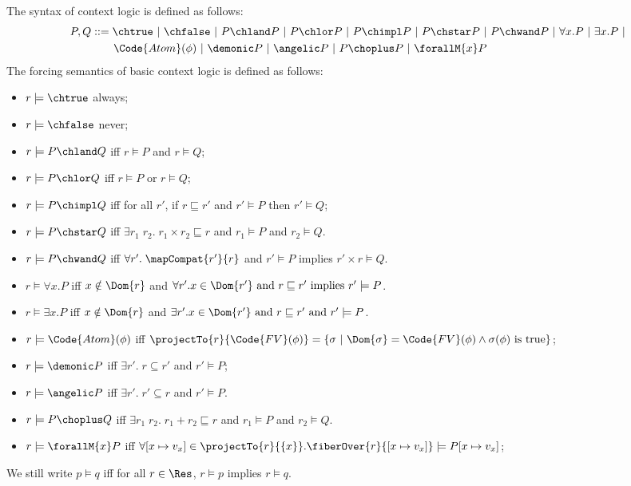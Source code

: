 \begin{definition}
\begin{definition}\label{def:context-logic} The syntax of context logic is defined as follows:
  \begin{align*}
    P, Q &::= \chtrue ~|~ \chfalse ~|~ P \chland P ~|~ P \chlor P ~|~ P \chimpl P ~|~ P \chstar P ~|~ P \chwand P ~|~ \forall x. P ~|~ \exists x. P ~|~ 
    \\& \qquad \Code{Atom}(\phi) ~|~ \demonic P ~|~ \angelic P ~|~ P \choplus P ~|~ \forallM{x} P
  \end{align*}\noindent
The forcing semantics of basic context logic is defined as follows:
\begin{itemize}
\item $r \models \chtrue$ always;
\item $r \models \chfalse$ never;
\item $r \models P \chland Q$ iff $r \models P$ and $r \models Q$;
\item $r \models P \chlor Q$ iff $r \models P$ or $r \models Q$;
\item $r \models P \chimpl Q$ iff for all $r'$, if $r \sqsubseteq r'$ and $r' \models P$ then $r' \models Q$;
\item $r \models P \chstar Q$ iff $\exists r_1\;r_2.\; r_1 \times r_2 \sqsubseteq r$ and
  $r_1 \models P$ and $r_2 \models Q$.
\item $r \models P \chwand Q$ iff $\forall r'.\; \mapCompat{r'}{r}$ and $r' \models P$ implies
  $r' \times r \models Q$.
\item $r \models \forall x.P$ iff $x\notin \Dom{r}$ and $\forall r'. x\in \Dom{r'} \text{ and }r \sqsubseteq r' \text{ implies } r' \models P$.
\item $r \models \exists x.P$ iff $x\notin \Dom{r}$ and $\exists r'. x\in \Dom{r'} \text{ and }r \sqsubseteq r' \text{ and } r' \models P$.
\item $r \models \Code{Atom}(\phi)$ iff $\projectTo{r}{\Code{FV}(\phi)} = \{\sigma ~|~ \Dom{\sigma} = \Code{FV}(\phi) \land \sigma(\phi) \text{ is true} \}$;
\item $r \models \demonic P$ iff $\exists r'.\; r \subseteq r'$ and
$r' \models P$;
\item $r \models \angelic P$ iff $\exists r'.\; r' \subseteq r$ and
$r' \models P$.
\item $r \models P \choplus Q$ iff $\exists r_1\;r_2.\; r_1 + r_2 \sqsubseteq r$ and
  $r_1 \models P$ and $r_2 \models Q$.
\item $r \models \forallM{x}P$ iff $\forall [x\mapsto v_x] \in \projectTo{r}{\{x\}}. \fiberOver{r}{[x\mapsto v_x]} \models P[x\mapsto v_x]$;
\end{itemize}
We still write $p \models q$ iff for all $r \in \Res$, $r \models p$ implies $r \models q$.
\end{definition}


\end{definition}
